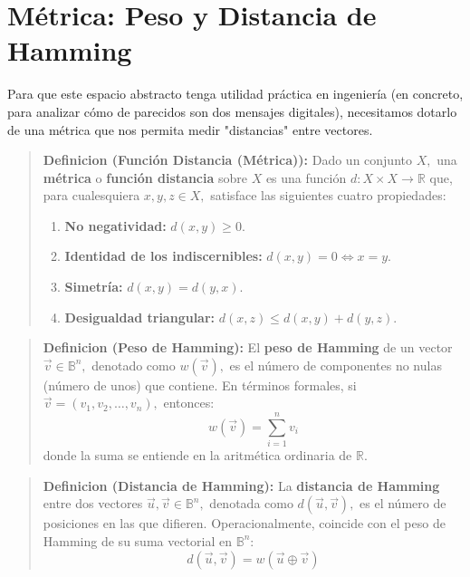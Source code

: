 \section{Métrica: Peso y Distancia de Hamming}

Para que este espacio abstracto tenga utilidad práctica en ingeniería (en concreto, para analizar cómo de parecidos son dos mensajes digitales), necesitamos dotarlo de una métrica que nos permita medir "distancias" entre vectores.

\begin{quote}\textbf{Definicion (Función Distancia (Métrica)):}\label{metrica}
Dado un conjunto $X,$ una \textbf{métrica} o \textbf{función distancia} sobre $X$ es una función $d: X \times X \to \mathbb{R}$ que, para cualesquiera $x, y, z \in X,$ satisface las siguientes cuatro propiedades:
\begin{enumerate}
    \item \textbf{No negatividad:} $d(x, y) \ge 0.$
    \item \textbf{Identidad de los indiscernibles:} $d(x, y) = 0 \iff x = y.$
    \item \textbf{Simetría:} $d(x, y) = d(y, x).$
    \item \textbf{Desigualdad triangular:} $d(x, z) \le d(x, y) + d(y, z).$
\end{enumerate}
\end{quote}

\begin{quote}\textbf{Definicion (Peso de Hamming):}\label{peso_hamming}
El \textbf{peso de Hamming} de un vector $\vec{v} \in \mathbb{B}^n,$ denotado como $w(\vec{v}),$ es el número de componentes no nulas (número de unos) que contiene. En términos formales, si $\vec{v} = (v_1, v_2, \dots, v_n),$ entonces:
\[ w(\vec{v}) = \sum_{i=1}^n v_i \]
donde la suma se entiende en la aritmética ordinaria de $\mathbb{R}.$
\end{quote}

\begin{quote}\textbf{Definicion (Distancia de Hamming):}\label{distancia_hamming}
La \textbf{distancia de Hamming} entre dos vectores $\vec{u}, \vec{v} \in \mathbb{B}^n,$ denotada como $d(\vec{u}, \vec{v}),$ es el número de posiciones en las que difieren. Operacionalmente, coincide con el peso de Hamming de su suma vectorial en $\mathbb{B}^n:$
\[ d(\vec{u}, \vec{v}) = w(\vec{u} \oplus \vec{v}) \]
\end{quote}

